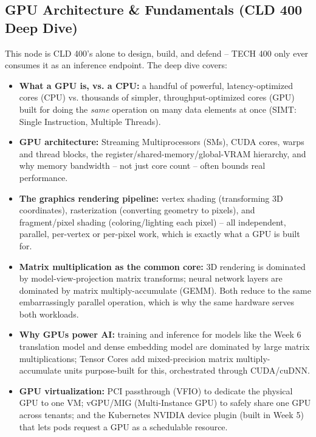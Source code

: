 \documentclass[10pt, a4paper]{article}
\begin{document}
\subsection*{GPU Architecture \& Fundamentals (CLD 400 Deep Dive)}
This node is CLD 400's alone to design, build, and defend -- TECH 400 only ever consumes it as an inference endpoint. The deep dive covers:
\begin{itemize}
    \item \textbf{What a GPU is, vs. a CPU:} a handful of powerful, latency-optimized cores (CPU) vs. thousands of simpler, throughput-optimized cores (GPU) built for doing the \emph{same} operation on many data elements at once (SIMT: Single Instruction, Multiple Threads).
    \item \textbf{GPU architecture:} Streaming Multiprocessors (SMs), CUDA cores, warps and thread blocks, the register/shared-memory/global-VRAM hierarchy, and why memory bandwidth -- not just core count -- often bounds real performance.
    \item \textbf{The graphics rendering pipeline:} vertex shading (transforming 3D coordinates), rasterization (converting geometry to pixels), and fragment/pixel shading (coloring/lighting each pixel) -- all independent, parallel, per-vertex or per-pixel work, which is exactly what a GPU is built for.
    \item \textbf{Matrix multiplication as the common core:} 3D rendering is dominated by model-view-projection matrix transforms; neural network layers are dominated by matrix multiply-accumulate (GEMM). Both reduce to the same embarrassingly parallel operation, which is why the same hardware serves both workloads.
    \item \textbf{Why GPUs power AI:} training and inference for models like the Week 6 translation model and dense embedding model are dominated by large matrix multiplications; Tensor Cores add mixed-precision matrix multiply-accumulate units purpose-built for this, orchestrated through CUDA/cuDNN.
    \item \textbf{GPU virtualization:} PCI passthrough (VFIO) to dedicate the physical GPU to one VM; vGPU/MIG (Multi-Instance GPU) to safely share one GPU across tenants; and the Kubernetes NVIDIA device plugin (built in Week 5) that lets pods request a GPU as a schedulable resource.
\end{itemize}

\vspace{0.5em}

\end{document}
